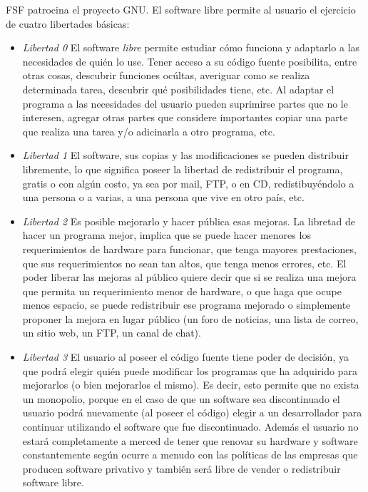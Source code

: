	FSF patrocina el proyecto GNU. El software libre permite al usuario el ejercicio de cuatro libertades básicas:
	\begin {itemize}
	\item
 	\textit{Libertad 0} El software \textit{libre} permite estudiar cómo funciona y adaptarlo a las necesidades de quién lo use. Tener acceso a
 	su código fuente posibilita, entre otras cosas, descubrir funciones ocúltas, averiguar como se realiza determinada tarea, descubrir qué
 	posibilidades tiene, etc. Al adaptar el programa a las necesidades del usuario pueden suprimirse partes que no le interesen, agregar otras partes
 	que considere importantes copiar una parte que realiza una tarea y/o adicinarla a otro programa, etc.
	\item
	\textit{Libertad 1} El software, sus copias y las modificaciones se pueden distribuir libremente, lo que significa poseer la libertad de redistribuir
	el programa, gratis o con algún costo, ya sea por mail, FTP, o en CD, redistibuyéndolo a una persona o a varias, a una persona que vive en otro país,
	etc.
	\item 
	\textit{Libertad 2} Es posible mejorarlo y hacer pública esas mejoras. La libretad de hacer un programa mejor, implica que se puede hacer menores los
	requerimientos de hardware para funcionar, que tenga mayores prestaciones, que sus requerimientos no sean tan altos, que tenga menos errores, etc. El
	poder liberar las mejoras al público quiere decir que si se realiza una mejora que permita un requerimiento menor de hardware, o que haga que ocupe
	menos espacio, se puede redistribuir ese programa mejorado o simplemente proponer la mejora en lugar público (un foro de noticias, una lista de
	correo, un sitio web, un FTP, un canal de chat).
	\item 
	\textit{Libertad 3} El usuario al poseer el código fuente tiene poder de decisión, ya que podrá elegir quién puede modificar los programas que ha
	adquirido para mejorarlos (o bien mejorarlos el mismo). Es decir, esto permite que no exista un monopolio, porque en el caso de que un software sea
	discontinuado el usuario podrá nuevamente (al poseer el código) elegir a un desarrollador para continuar utilizando el software que fue
	discontinuado. Además el usuario no estará completamente a merced de tener que renovar su hardware y software constantemente según ocurre a menudo
	con las políticas de las empresas que producen software privativo y también será libre de vender o redistribuir software libre.
 	\end {itemize}
